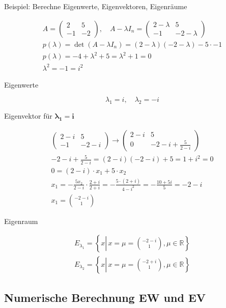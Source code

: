Beispiel: Berechne Eigenwerte, Eigenvektoren, Eigenräume

$$
\begin{gathered}
A=\left(\begin{array}{cc}
2 & 5 \\
-1 & -2
\end{array}\right), \quad A-\lambda I_{n}=\left(\begin{array}{cc}
2-\lambda & 5 \\
-1 & -2-\lambda
\end{array}\right) \\
p(\lambda)=\operatorname{det}\left(A-\lambda I_{n}\right)=(2-\lambda)(-2-\lambda)-5 \cdot-1 \\
p(\lambda)=-4+\lambda^{2}+5=\lambda^{2}+1=0 \\
\lambda^{2}=-1=i^{2}
\end{gathered}
$$

Eigenwerte

$$
\lambda_{1}=i, \quad \lambda_{2}=-i
$$

Eigenvektor für $\boldsymbol{\lambda}_{\mathbf{1}}=\boldsymbol{i}$

$$
\begin{gathered}
\left(\begin{array}{cc}
2-i & 5 \\
-1 & -2-i
\end{array}\right) \rightarrow\left(\begin{array}{cc}
2-i & 5 \\
0 & -2-i+\frac{5}{2-i}
\end{array}\right) \\
-2-i+\frac{5}{2-i}=(2-i)(-2-i)+5=1+i^{2}=0 \\
0=(2-i) \cdot x_{1}+5 \cdot x_{2} \\
x_{1}=-\frac{5 x_{2}}{2-i} \cdot \frac{2+i}{2+i}=-\frac{5 \cdot(2+i)}{4-i^{2}}=-\frac{10+5 i}{5}=-2-i \\
x_{1}=\binom{-2-i}{1}
\end{gathered}
$$

Eigenraum

$$
\begin{gathered}
E_{\lambda_{1}}=\left\{x \left\lvert\, x=\mu=\binom{-2-i}{1}\right., \mu \in \mathbb{R}\right\} \\
E_{\lambda_{2}}=\left\{x \left\lvert\, x=\mu=\binom{-2+i}{1}\right., \mu \in \mathbb{R}\right\}
\end{gathered}
$$

\subsection{Numerische Berechnung EW und EV}

